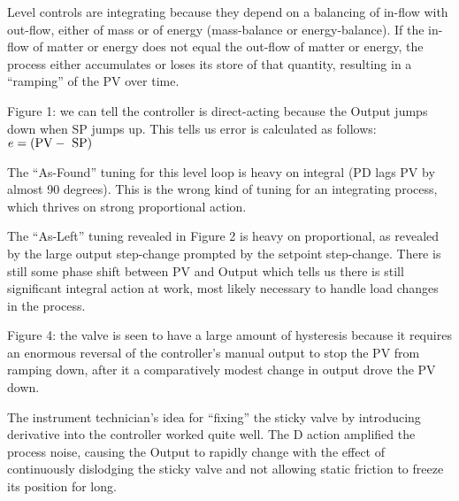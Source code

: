 












Level controls are integrating because they depend on a balancing of in-flow with out-flow, either of mass or of energy (mass-balance or energy-balance).  If the in-flow of matter or energy does not equal the out-flow of matter or energy, the process either accumulates or loses its store of that quantity, resulting in a ``ramping'' of the PV over time.

\vskip 10pt

Figure 1: we can tell the controller is direct-acting because the Output jumps down when SP jumps up.  This tells us error is calculated as follows: $e = (\hbox{PV} - \hbox{ SP})$

\vskip 10pt

The ``As-Found'' tuning for this level loop is heavy on integral (PD lags PV by almost 90 degrees).  This is the wrong kind of tuning for an integrating process, which thrives on strong proportional action.

\vskip 10pt

The ``As-Left'' tuning revealed in Figure 2 is heavy on proportional, as revealed by the large output step-change prompted by the setpoint step-change.  There is still some phase shift between PV and Output which tells us there is still significant integral action at work, most likely necessary to handle load changes in the process.

\vskip 10pt

Figure 4: the valve is seen to have a large amount of hysteresis because it requires an enormous reversal of the controller's manual output to stop the PV from ramping down, after it a comparatively modest change in output drove the PV down.

\vskip 10pt

The instrument technician's idea for ``fixing'' the sticky valve by introducing derivative into the controller worked quite well.  The D action amplified the process noise, causing the Output to rapidly change with the effect of continuously dislodging the sticky valve and not allowing static friction to freeze its position for long.















